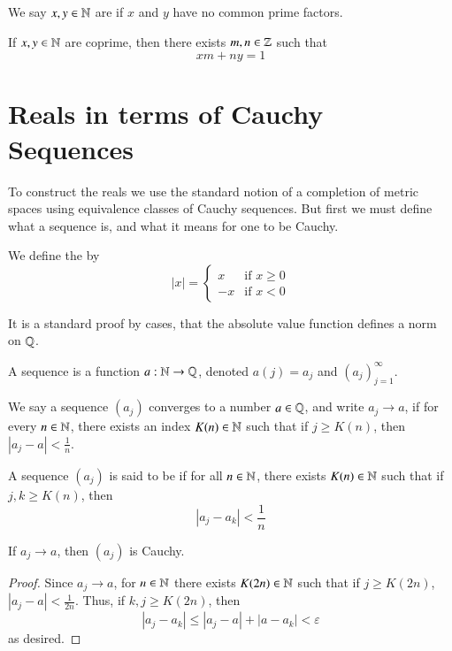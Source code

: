\begin{definition}
    We say $x,y \in \mathbb N$ are  if $x$ and $y$ have no common prime factors.
\end{definition}

\begin{proposition}
    If $x,y \in \mathbb N$ are coprime, then there exists $m,n \in \mathbb Z$ such that $$xm+ny = 1$$
\end{proposition}

\section{Reals in terms of Cauchy Sequences}

To construct the reals we use the standard notion of a completion of metric spaces using equivalence classes of Cauchy sequences. But first we must define what a sequence is, and what it means for one to be Cauchy.

\begin{definition}
    We define the  by $$|x| = \left\{\begin{array}{cc} x & \text{if }x \geq 0 \\ -x & \text{if } x < 0\end{array}\right.$$
\end{definition}

It is a standard proof by cases, that the absolute value function defines a norm on $\mathbb Q$.

\begin{definition}
    A sequence is a function $a:\mathbb N\rightarrow \mathbb Q$, denoted $a(j) = a_j$ and $(a_j)_{j=1}^{\infty}$.
\end{definition}

\begin{definition}
    We say a sequence $(a_j)$ converges to a number $a \in \mathbb Q$, and write $a_j\rightarrow a$, if for every $n \in \mathbb N$, there exists an index $K(n) \in \mathbb N$ such that if $j\geq K(n)$, then $|a_j - a| < \frac{1}{n}$.
\end{definition}

\begin{definition}
    A sequence $(a_j)$ is said to be  if for all $n \in \mathbb N$, there exists $K(n) \in \mathbb N$ such that if $j,k \geq K(n)$, then $$|a_j - a_k| < \frac{1}{n}$$
\end{definition}

\begin{proposition}
    If $a_j\rightarrow a$, then $(a_j)$ is Cauchy.
\end{proposition}
\begin{proof}
    Since $a_j \rightarrow a$, for $n \in \mathbb N$ there exists $K(2n) \in \mathbb N$ such that if $j \geq K(2n)$, $|a_j - a| < \frac{1}{2n}$. Thus, if $k,j \geq K(2n)$, then $$|a_j - a_k| \leq |a_j - a| + |a - a_k| < \varepsilon$$ as desired.
\end{proof}


